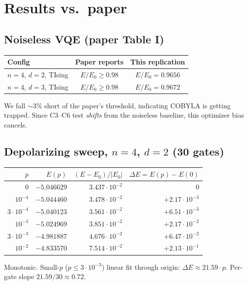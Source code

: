 \documentclass[11pt]{article}
\begin{document}
\section{Results vs.\ paper}

\subsection{Noiseless VQE (paper Table I)}
\begin{center}
\begin{tabular}{lcc}
\toprule
Config & Paper reports & This replication \\
\midrule
$n=4$, $d=2$, TIsing & $E/E_0 \ge 0.98$ & $E/E_0 = 0.9656$ \\
$n=4$, $d=3$, TIsing & $E/E_0 \ge 0.98$ & $E/E_0 = 0.9672$ \\
\bottomrule
\end{tabular}
\end{center}

We fall $\sim 3\%$ short of the paper's threshold, indicating COBYLA is getting trapped. Since C3--C6
test \emph{shifts} from the noiseless baseline, this optimizer bias cancels.

\subsection{Depolarizing sweep, $n=4$, $d=2$ (30 gates)}
\begin{center}
\begin{tabular}{rrrr}
\toprule
$p$ & $E(p)$ & $(E-E_0)/|E_0|$ & $\Delta E = E(p)-E(0)$ \\
\midrule
0        & $-5.046629$ & $3.437\!\cdot\!10^{-2}$ & 0 \\
$10^{-4}$ & $-5.044460$ & $3.478\!\cdot\!10^{-2}$ & $+2.17\!\cdot\!10^{-3}$ \\
$3\!\cdot\!10^{-4}$ & $-5.040123$ & $3.561\!\cdot\!10^{-2}$ & $+6.51\!\cdot\!10^{-3}$ \\
$10^{-3}$ & $-5.024969$ & $3.851\!\cdot\!10^{-2}$ & $+2.17\!\cdot\!10^{-2}$ \\
$3\!\cdot\!10^{-3}$ & $-4.981887$ & $4.676\!\cdot\!10^{-2}$ & $+6.47\!\cdot\!10^{-2}$ \\
$10^{-2}$ & $-4.833570$ & $7.514\!\cdot\!10^{-2}$ & $+2.13\!\cdot\!10^{-1}$ \\
\bottomrule
\end{tabular}
\end{center}

Monotonic. Small-$p$ ($p\le 3\!\cdot\!10^{-3}$) linear fit through origin:
$\Delta E \approx 21.59 \cdot p$. Per-gate slope $21.59/30 \approx 0.72$.
\end{document}
